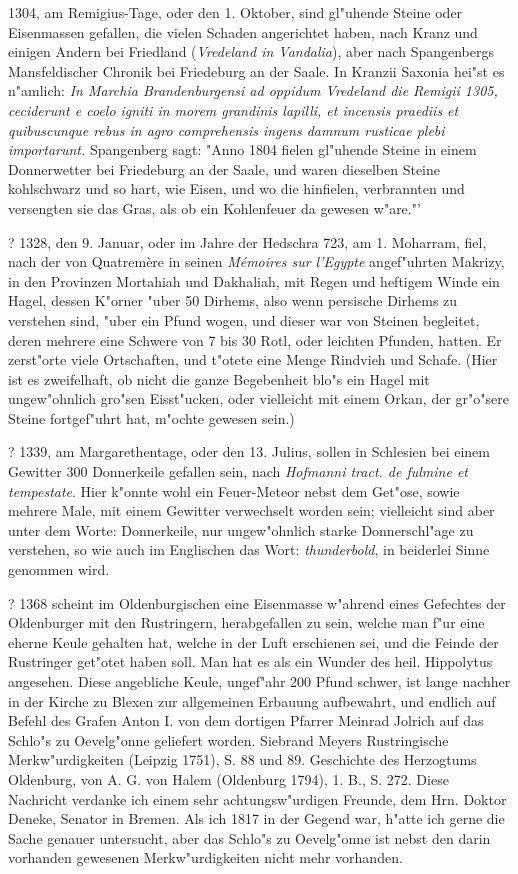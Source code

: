 \documentclass[a4paper, 11pt, oneside, polutonikogreek, german]{article}
\begin{document}
1304, am Remigius-Tage, oder den 1. Oktober, sind gl"uhende Steine oder Eisenmassen gefallen, die vielen Schaden angerichtet haben, nach Kranz und einigen Andern bei Friedland (\emph{Vredeland in Vandalia}), aber nach Spangenbergs Mansfeldischer Chronik bei Friedeburg an der Saale. In Kranzii Saxonia hei"st es n"amlich: \emph{In Marchia Brandenburgensi ad oppidum Vredeland die Remigii 1305, ceciderunt e coelo igniti in morem grandinis lapilli, et incensis praediis et quibuscunque rebus in agro comprehensis ingens damnum rusticae plebi importarunt.} Spangenberg sagt: "Anno 1804 fielen gl"uhende Steine in einem Donnerwetter bei Friedeburg an der Saale, und waren dieselben Steine kohlschwarz und so hart, wie Eisen, und wo die hinfielen, verbrannten und versengten sie das Gras, als ob ein Kohlenfeuer da gewesen w"are."'

? 1328, den 9. Januar, oder im Jahre der Hedschra 723, am 1. Moharram, fiel, nach der von Quatremère in seinen \emph{Mémoires sur l'Egypte} angef"uhrten Makrizy, in den Provinzen Mortahiah und Dakhaliah, mit Regen und heftigem Winde ein Hagel, dessen K"orner "uber 50 Dirhems, also wenn persische Dirhems zu verstehen sind, "uber ein Pfund wogen, und dieser war von Steinen begleitet, deren mehrere eine Schwere von 7 bis 30 Rotl, oder leichten Pfunden, hatten. Er zerst"orte viele Ortschaften, und t"otete eine Menge Rindvieh und Schafe. (Hier ist es zweifelhaft, ob nicht die ganze Begebenheit blo"s ein Hagel mit ungew"ohnlich gro"sen Eisst"ucken, oder vielleicht mit einem Orkan, der gr"o"sere Steine fortgef"uhrt hat, m"ochte gewesen sein.)

? 1339, am Margarethentage, oder den 13. Julius, sollen in Schlesien bei einem Gewitter 300 Donnerkeile gefallen sein, nach \emph{Hofmanni tract. de fulmine et tempestate}. Hier k"onnte wohl ein Feuer-Meteor nebst dem Get"ose, sowie mehrere Male, mit einem Gewitter verwechselt worden sein; vielleicht sind aber unter dem Worte: Donnerkeile, nur ungew"ohnlich starke Donnerschl"age zu verstehen, so wie auch im Englischen das Wort: \emph{thunderbold}, in beiderlei Sinne genommen wird.

? 1368 scheint im Oldenburgischen eine Eisenmasse w"ahrend eines Gefechtes der Oldenburger mit den Rustringern, herabgefallen zu sein, welche man f"ur eine eherne Keule gehalten hat, welche in der Luft erschienen sei, und die Feinde der Rustringer get"otet haben soll. Man hat es als ein Wunder des heil. Hippolytus angesehen. Diese angebliche Keule, ungef"ahr 200 Pfund schwer, ist lange nachher in der Kirche zu Blexen zur allgemeinen Erbauung aufbewahrt, und endlich auf Befehl des Grafen Anton I. von dem dortigen Pfarrer Meinrad Jolrich auf das Schlo"s zu Oevelg"onne geliefert worden. Siebrand Meyers Rustringische Merkw"urdigkeiten (Leipzig 1751), S. 88 und 89. Geschichte des Herzogtums Oldenburg, von A. G. von Halem (Oldenburg 1794), 1. B., S. 272. Diese Nachricht verdanke ich einem sehr achtungsw"urdigen Freunde, dem Hrn. Doktor Deneke, Senator in Bremen. Als ich 1817 in der Gegend war, h"atte ich gerne die Sache genauer untersucht, aber das Schlo"s zu Oevelg"onne ist nebst den darin vorhanden gewesenen Merkw"urdigkeiten nicht mehr vorhanden.
\end{document}

